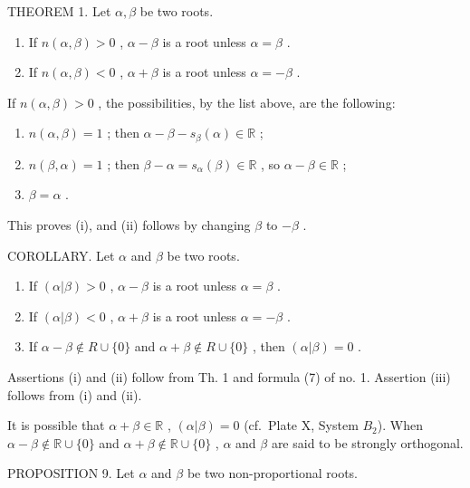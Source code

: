 THEOREM 1. Let \(\alpha, \beta\) be two roots.

\begin{enumerate}
\def\labelenumi{(\roman{enumi})}
\item
  If \(n(\alpha, \beta) > 0\) , \(\alpha - \beta\) is a root unless \(\alpha = \beta\) .
\item
  If \(n(\alpha, \beta) < 0\) , \(\alpha + \beta\) is a root unless \(\alpha = -\beta\) .
\end{enumerate}

If \(n(\alpha, \beta) > 0\) , the possibilities, by the list above, are the following:

\begin{enumerate}
\def\labelenumi{\arabic{enumi})}
\item
  \(n(\alpha, \beta) = 1\) ; then \(\alpha - \beta - s_{\beta}(\alpha) \in \mathbb{R}\) ;
\item
  \(n(\beta, \alpha) = 1\) ; then \(\beta - \alpha = s_{\alpha}(\beta) \in \mathbb{R}\) , so \(\alpha - \beta \in \mathbb{R}\) ;
\item
  \(\beta = \alpha\) .
\end{enumerate}

This proves (i), and (ii) follows by changing \(\beta\) to \(-\beta\) .

COROLLARY. Let \(\alpha\) and \(\beta\) be two roots.

\begin{enumerate}
\def\labelenumi{(\roman{enumi})}
\item
  If \((\alpha |\beta) > 0\) , \(\alpha - \beta\) is a root unless \(\alpha = \beta\) .
\item
  If \((\alpha |\beta) < 0\) , \(\alpha + \beta\) is a root unless \(\alpha = -\beta\) .
\item
  If \(\alpha - \beta \notin R \cup \{0\}\) and \(\alpha + \beta \notin R \cup \{0\}\) , then \((\alpha | \beta) = 0\) .
\end{enumerate}

Assertions (i) and (ii) follow from Th. 1 and formula (7) of no. 1. Assertion (iii) follows from (i) and (ii).

It is possible that \(\alpha + \beta \in \mathbb{R}\) , \((\alpha|\beta) = 0\) (cf.~Plate X, System \(B_{2}\)). When \(\alpha - \beta \notin \mathbb{R} \cup \{0\}\) and \(\alpha + \beta \notin \mathbb{R} \cup \{0\}\) , \(\alpha\) and \(\beta\) are said to be strongly orthogonal.

PROPOSITION 9. Let \(\alpha\) and \(\beta\) be two non-proportional roots.

